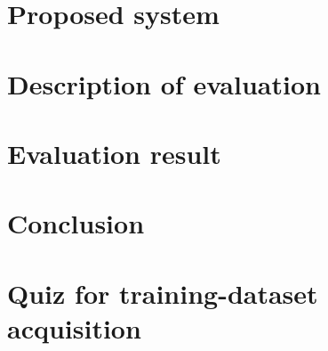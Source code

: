 \documentclass{ieeeaccess}
\begin{document}
\section{Proposed system}
\label{sec:proposed-system}


\section{Description of evaluation}
\label{sec:evaluation}


\section{Evaluation result}
\label{sec:evaluation-result}


\section{Conclusion}
\label{sec:conclusion}








\appendix
\section{Quiz for training-dataset acquisition}


\EOD
\end{document}
